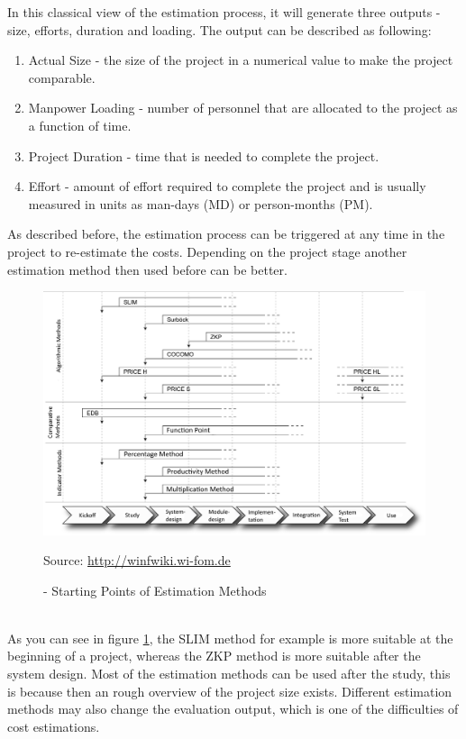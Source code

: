 In this classical view of the estimation process, it will generate three outputs - size, efforts, duration and loading. The output can be described as following:
\begin{enumerate}
	\item Actual Size - the size of the project in a numerical value to make the project comparable.
	\item Manpower Loading - number of personnel that are allocated to the project as a function of time.
	\item Project Duration - time that is needed to complete the project.
	\item Effort - amount of effort required to complete the project and is usually measured in units as man-days (MD) or person-months (PM).
\end{enumerate}
As described before, the estimation process can be triggered at any time in the project to re-estimate the costs. Depending on the project stage another estimation method then used before can be better.\\
\begin{figure}[h] 
	\centering 
	\includegraphics[width=13cm]{images/Einsatzzeitpunkte2.PNG} 
	\caption{- Starting Points of Estimation Methods} 
	Source: \url{http://winfwiki.wi-fom.de}
	\label{fig:estimationMethodInStage}
\end{figure}\\
As you can see in figure \ref{fig:estimationMethodInStage}, the SLIM method for example is more suitable at the beginning of a project, whereas the ZKP method is more suitable after the system design. Most of the estimation methods can be used after the study, this is because then an rough overview of the project size exists. Different estimation methods may also change the evaluation output, which is one of the difficulties of cost estimations.\\

